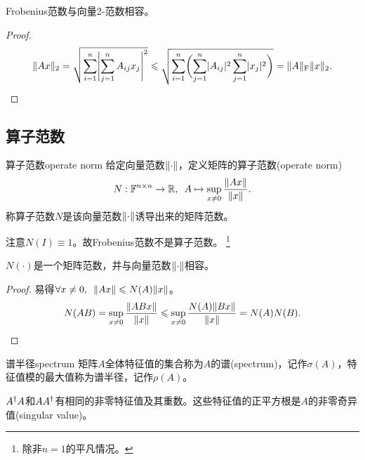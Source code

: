 \begin{theorem}
    {}{}
    Frobenius范数与向量2-范数相容。
\end{theorem}

\begin{proof}
    \[
        \lVert Ax\rVert_2 = \sqrt{\sum_{i=1}^n\Biggl\lvert\sum_{j=1}^n A_{ij}x_j\Biggr\rvert^2} \leqslant \sqrt{\sum_{i=1}^n\biggl(\sum_{j=1}^n\lvert A_{ij}\rvert^2\sum_{j=1}^n\lvert x_j\rvert^2\biggr)} = \lVert A\rVert_{\mathrm F}\lVert x\rVert_2.
        \qedhere
    \]
\end{proof}

\subsection{算子范数}

\begin{definition}
    {算子范数}{operate norm}
    给定向量范数$\lVert\cdot\rVert$，定义矩阵的算子范数(operate norm)
    \begin{equation}
        N:\mathbb{F}^{n\times n} \to \mathbb{R},\enspace A \mapsto \sup_{x\neq 0}\frac{\lVert Ax\rVert}{\lVert x\rVert}.
    \end{equation}
    称算子范数$N$是该向量范数$\lVert\cdot\rVert$诱导出来的矩阵范数。
\end{definition}

\begin{remark}
    注意$N(I) \equiv 1$。故Frobenius范数不是算子范数。
    \footnote{除非$n = 1$的平凡情况。}
\end{remark}

\begin{theorem}
    {}{}
    $N(\cdot)$是一个矩阵范数，并与向量范数$\lVert\cdot\rVert$相容。
\end{theorem}

\begin{proof}
    易得$\forall x \neq 0,\enspace\lVert Ax\rVert \leqslant N(A)\lVert x\rVert$。
    \[
        N(AB) = \sup_{x\neq 0}\frac{\lVert ABx\rVert}{\lVert x\rVert} \leqslant \sup_{x\neq 0}\frac{N(A)\lVert Bx\rVert}{\lVert x\rVert} = N(A)N(B).
        \qedhere
    \]
\end{proof}

\begin{definition}
    {谱半径}{spectrum}
    矩阵$A$全体特征值的集合称为$A$的谱(spectrum)，记作$\sigma(A)$，特征值模的最大值称为谱半径，记作$\rho(A)$。
\end{definition}

\begin{remark}
    $A^\dagger A$和$AA^\dagger$有相同的非零特征值及其重数。这些特征值的正平方根是$A$的非零奇异值(singular value)。
\end{remark}

